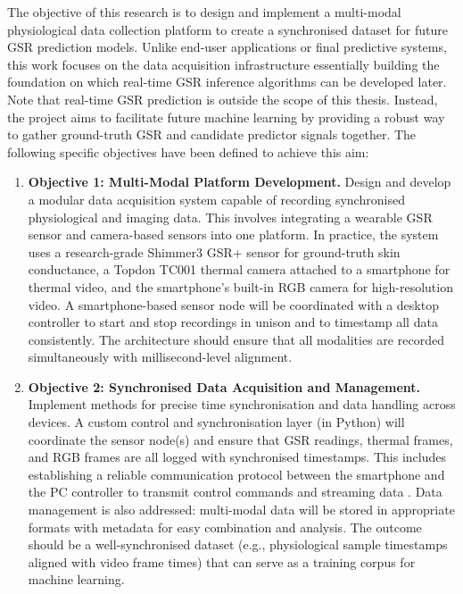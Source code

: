 The objective of this research is to design and implement a multi-modal physiological data collection platform to create a synchronised dataset for future GSR prediction models. Unlike end-user applications or final predictive systems, this work focuses on the data acquisition infrastructure \textemdash essentially building the foundation on which real-time GSR inference algorithms can be developed later. Note that real-time GSR prediction is outside the scope of this thesis. Instead, the project aims to facilitate future machine learning by providing a robust way to gather ground-truth GSR and candidate predictor signals together. The following specific objectives have been defined to achieve this aim:

\begin{enumerate}
    \item \textbf{Objective 1: Multi-Modal Platform Development.} Design and develop a modular data acquisition system capable of recording synchronised physiological and imaging data. This involves integrating a wearable GSR sensor and camera-based sensors into one platform. In practice, the system uses a research-grade Shimmer3 GSR+ sensor \cite{ref8} for ground-truth skin conductance, a Topdon TC001 thermal camera \cite{ref20} attached to a smartphone for thermal video, and the smartphone's built-in RGB camera for high-resolution video. A smartphone-based sensor node will be coordinated with a desktop controller to start and stop recordings in unison and to timestamp all data consistently. The architecture should ensure that all modalities are recorded simultaneously with millisecond-level alignment.
    \item \textbf{Objective 2: Synchronised Data Acquisition and Management.} Implement methods for precise time synchronisation and data handling across devices. A custom control and synchronisation layer (in Python) will coordinate the sensor node(s) and ensure that GSR readings, thermal frames, and RGB frames are all logged with synchronised timestamps. This includes establishing a reliable communication protocol between the smartphone and the PC controller to transmit control commands and streaming data \cite{ref9}. Data management is also addressed: multi-modal data will be stored in appropriate formats with metadata for easy combination and analysis. The outcome should be a well-synchronised dataset (e.g., physiological sample timestamps aligned with video frame times) that can serve as a training corpus for machine learning.

\end{enumerate}
